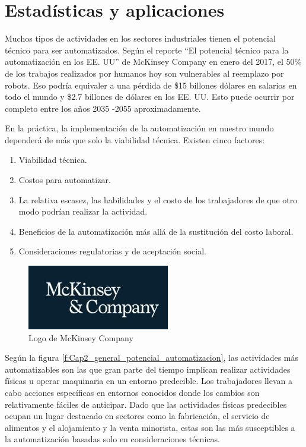                 \newpage


\section{Estadísticas y aplicaciones}

    Muchos tipos de actividades en los sectores industriales tienen el potencial técnico para ser automatizados. Según el reporte ``El potencial técnico para la automatización en los EE. UU'' de McKinsey Company en enero del 2017, el 50\% de los trabajos realizados por humanos hoy son vulnerables al reemplazo por robots. Eso podría equivaler a una pérdida de \$15 billones dólares en salarios en todo el mundo y \$2.7 billones de dólares en los EE. UU. Esto puede ocurrir por completo entre los años 2035 -2055 aproximadamente. 
    
    En la práctica, la implementación de la automatización en nuestro mundo dependerá de más que solo la viabilidad técnica. Existen cinco factores:

        \begin{enumerate}
           \item {Viabilidad técnica.}
            \item {Costos para automatizar.}
            \item {La relativa escasez, las habilidades y el costo de los trabajadores de que otro modo podrían realizar la actividad.}
           \item {Beneficios de la automatización más allá de la sustitución del costo laboral.}
            \item {Consideraciones regulatorias y de aceptación social.}
    \end{enumerate}
    
    \begin{figure}[h]
        \centering
        \includegraphics[width=0.2\linewidth]{Main/Chapter2/Images2/LOGOMCKINSEY.jpg}
        \caption{Logo de McKinsey Company \cite{mckinsey}}
        \label{f:Cap2_general_potencial_automatizacion_11}
    \end{figure}
    
    Según la figura \eqref{f:Cap2_general_potencial_automatizacion}, las actividades más automatizables son las que gran parte del tiempo implican realizar actividades físicas u operar maquinaria en un entorno predecible. Los trabajadores llevan a cabo acciones específicas en entornos conocidos donde los cambios son relativamente fáciles de anticipar. Dado que las actividades físicas predecibles ocupan un lugar destacado en sectores como la fabricación, el servicio de alimentos y el alojamiento y la venta minorista, estas son las más susceptibles a la automatización basadas solo en consideraciones técnicas.
    
